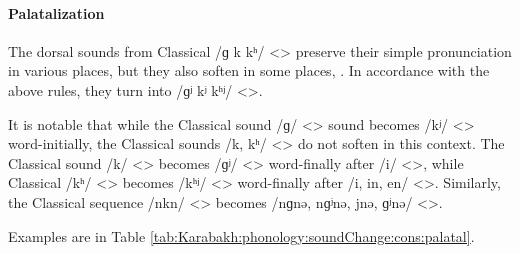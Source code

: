 \paragraph{Palatalization} 

The dorsal sounds from Classical /ɡ k kʰ/ <> preserve their simple pronunciation in various places, but they also soften in some places, . In accordance with the above rules, they turn into /ɡʲ kʲ kʰʲ/ <>. 

It is notable that while the Classical sound /ɡ/ <> sound becomes /kʲ/ <> word-initially, the Classical sounds /k, kʰ/ <> do not soften in this context. The Classical sound /k/ <> becomes /ɡʲ/ <> word-finally after /i/ <>, while Classical /kʰ/ <> becomes /kʰʲ/ <> word-finally after /i, in, en/ <>. Similarly, the Classical sequence /nkn/ <> becomes /nɡnə, nɡʲnə, jnə, ɡʲnə/ <>. 



Examples are in Table \ref{tab:Karabakh:phonology:soundChange:cons:palatal}. 


